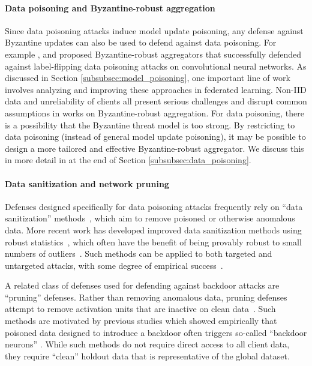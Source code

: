 \paragraph{Data poisoning and Byzantine-robust aggregation}
Since data poisoning attacks induce model update poisoning, any defense against Byzantine updates can also be used to defend against data poisoning. For example \citet{xie2019zeno}, \citet{xie2019zeno++} and \citet{xie2019practicalsecure} proposed Byzantine-robust aggregators that successfully defended against label-flipping data poisoning attacks on convolutional neural networks. As discussed in Section \ref{subsubsec:model_poisoning}, one important line of work involves analyzing and improving these approaches in federated learning. Non-IID data and unreliability of clients all present serious challenges and disrupt common assumptions in works on Byzantine-robust aggregation. For data poisoning, there is a possibility that the Byzantine threat model is too strong. By restricting to data poisoning (instead of general model update poisoning), it may be possible to design a more tailored and effective Byzantine-robust aggregator. We discuss this in more detail in at the end of Section \ref{subsubsec:data_poisoning}.

\paragraph{Data sanitization and network pruning} 
Defenses designed specifically for data poisoning attacks frequently rely on ``data sanitization'' methods~\citep{cretu2008casting}, which aim to remove poisoned or otherwise anomalous data. More recent work has developed improved data sanitization methods using robust statistics~\citep{steinhardt2017certified, pmlr-v97-shen19e, tran2018spectral, pmlr-v97-diakonikolas19a}, which often have the benefit of being provably robust to small numbers of outliers~\citep{pmlr-v97-diakonikolas19a}. Such methods can be applied to both targeted and untargeted attacks, with some degree of empirical success~\citep{pmlr-v97-shen19e}.

A related class of defenses used for defending against backdoor attacks are ``pruning'' defenses. Rather than removing anomalous data, pruning defenses attempt to remove activation units that are inactive on clean data~\citep{liu2018fine, wang2019neural}. Such methods are motivated by previous studies which showed empirically that poisoned data designed to introduce a backdoor often triggers so-called “backdoor neurons” \citep{gu2017badnets}. While such methods do not require direct access to all client data, they require “clean” holdout data that is representative of the global dataset.

